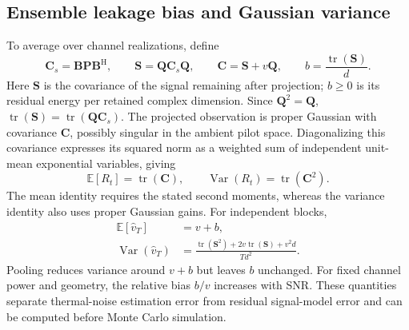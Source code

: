 \subsection{Ensemble leakage bias and Gaussian variance}
To average over channel realizations, define
\begin{equation}
 \mathbf C_s=\mathbf B\mathbf P\mathbf B^{\mathrm H},\qquad
 \mathbf S=\mathbf Q\mathbf C_s\mathbf Q,\qquad
 \mathbf C=\mathbf S+v\mathbf Q,\qquad
 b=\frac{\operatorname{tr}(\mathbf S)}{d}.
 \label{eq:leakagecovariance}
\end{equation}
Here $\mathbf S$ is the covariance of the signal remaining after projection;
$b\geq0$ is its residual energy per retained complex dimension. Since
$\mathbf Q^2=\mathbf Q$,
$\operatorname{tr}(\mathbf S)=\operatorname{tr}(\mathbf Q\mathbf C_s)$.
The projected observation is proper Gaussian with covariance $\mathbf C$,
possibly singular in the ambient pilot space. Diagonalizing this covariance
expresses its squared norm as a weighted sum of independent unit-mean
exponential variables, giving
\begin{equation}
 \mathbb E[R_t]=\operatorname{tr}(\mathbf C),\qquad
 \operatorname{Var}(R_t)=\operatorname{tr}(\mathbf C^2).
 \label{eq:singlemoments}
\end{equation}
The mean identity requires the stated second moments, whereas the variance
identity also uses proper Gaussian gains. For independent blocks,
\begin{align}
 \mathbb E[\widehat v_T]&=v+b,\label{eq:bias}\\
 \operatorname{Var}(\widehat v_T)
 &=\frac{\operatorname{tr}(\mathbf S^2)
          +2v\operatorname{tr}(\mathbf S)+v^2d}{Td^2}.
 \label{eq:independentvariance}
\end{align}
Pooling reduces variance around $v+b$ but leaves $b$ unchanged. For fixed
channel power and geometry, the relative bias $b/v$ increases with SNR.
These quantities separate thermal-noise estimation error from residual
signal-model error and can be computed before Monte Carlo simulation.

